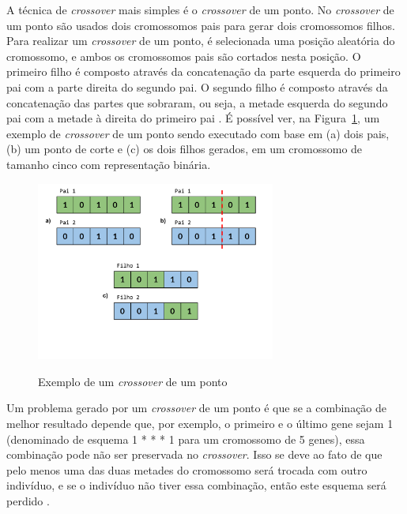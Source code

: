 \documentclass[12pt,oneside,a4paper,english,french,spanish,brazil,]{abntex2}
\begin{document}
A técnica de \textit{crossover} mais simples é o \textit{crossover} de um ponto. No \textit{crossover} de um ponto são usados dois cromossomos pais para gerar dois cromossomos filhos. Para realizar um \textit{crossover} de um ponto, é selecionada uma posição aleatória do cromossomo, e ambos os cromossomos pais são cortados nesta posição. O primeiro filho é composto através da concatenação da parte esquerda do primeiro pai com a parte direita do segundo pai. O segundo filho é composto através da concatenação das partes que sobraram, ou seja, a metade esquerda do segundo pai com a metade à direita do primeiro pai \cite{linden:2008}. É possível ver, na Figura~\ref{fig:GA_Crossover_de_um_ponto}, um exemplo de \textit{crossover}  de um ponto sendo executado com base em (a) dois pais, (b) um ponto de corte e (c) os dois filhos gerados, em um cromossomo de tamanho cinco com representação binária.

\begin{figure}[ht]
\centering
\caption{Exemplo de um \textit{crossover} de um ponto}
\includegraphics[width=0.7\textwidth]{imagens/GA_Crossover_de_um_ponto.pdf}
\label{fig:GA_Crossover_de_um_ponto}
\end{figure}

Um problema gerado por um \textit{crossover} de um ponto é que se a combinação de melhor resultado depende que, por exemplo, o primeiro e o último gene sejam 1 (denominado de esquema 1 * * * 1 para um cromossomo de 5 genes), essa combinação pode não ser preservada no \textit{crossover}. Isso se deve ao fato de que pelo menos uma das duas metades do cromossomo será trocada com outro indivíduo, e se o indivíduo não tiver essa combinação, então este esquema será perdido \cite{linden:2008}.
\end{document}
